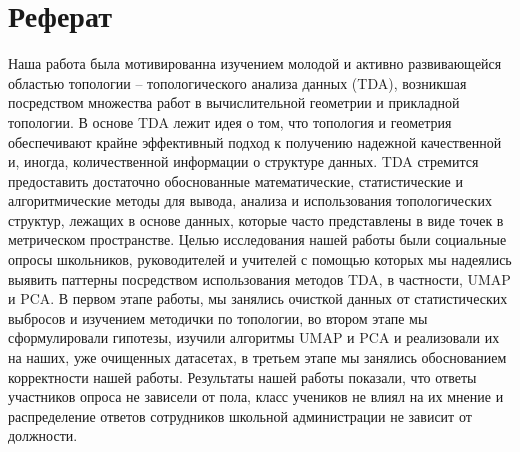 \section{Реферат}

Наша работа была мотивированна изучением молодой и активно развивающейся областью топологии -- топологического анализа данных (TDA), возникшая посредством множества работ в вычислительной геометрии и прикладной топологии. 
В основе TDA лежит идея о том, что топология и геометрия обеспечивают крайне эффективный подход к получению надежной качественной и, иногда, количественной информации о структуре данных.
TDA стремится предоставить достаточно обоснованные математические, статистические и алгоритмические методы для вывода, анализа и использования топологических структур, лежащих в основе данных, которые часто представлены в виде точек в метрическом пространстве. 
Целью исследования нашей работы были социальные опросы школьников, руководителей и учителей с помощью которых мы надеялись выявить паттерны посредством использования методов TDA, в частности, UMAP и PCA.
В первом этапе работы, мы занялись очисткой данных от статистических выбросов и изучением методички по топологии, во втором этапе мы сформулировали гипотезы, изучили алгоритмы UMAP и PCA и реализовали их на наших, уже очищенных датасетах, в третьем этапе мы занялись обоснованием корректности нашей работы.
Результаты нашей работы показали, что ответы участников опроса не зависели от пола, класс учеников не влиял на их мнение и распределение ответов сотрудников школьной администрации не зависит от должности.
